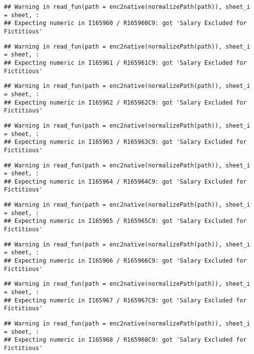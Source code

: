 \documentclass[
]{article}
\begin{document}
\begin{verbatim}
## Warning in read_fun(path = enc2native(normalizePath(path)), sheet_i = sheet, :
## Expecting numeric in I165960 / R165960C9: got 'Salary Excluded for Fictitious'
\end{verbatim}

\begin{verbatim}
## Warning in read_fun(path = enc2native(normalizePath(path)), sheet_i = sheet, :
## Expecting numeric in I165961 / R165961C9: got 'Salary Excluded for Fictitious'
\end{verbatim}

\begin{verbatim}
## Warning in read_fun(path = enc2native(normalizePath(path)), sheet_i = sheet, :
## Expecting numeric in I165962 / R165962C9: got 'Salary Excluded for Fictitious'
\end{verbatim}

\begin{verbatim}
## Warning in read_fun(path = enc2native(normalizePath(path)), sheet_i = sheet, :
## Expecting numeric in I165963 / R165963C9: got 'Salary Excluded for Fictitious'
\end{verbatim}

\begin{verbatim}
## Warning in read_fun(path = enc2native(normalizePath(path)), sheet_i = sheet, :
## Expecting numeric in I165964 / R165964C9: got 'Salary Excluded for Fictitious'
\end{verbatim}

\begin{verbatim}
## Warning in read_fun(path = enc2native(normalizePath(path)), sheet_i = sheet, :
## Expecting numeric in I165965 / R165965C9: got 'Salary Excluded for Fictitious'
\end{verbatim}

\begin{verbatim}
## Warning in read_fun(path = enc2native(normalizePath(path)), sheet_i = sheet, :
## Expecting numeric in I165966 / R165966C9: got 'Salary Excluded for Fictitious'
\end{verbatim}

\begin{verbatim}
## Warning in read_fun(path = enc2native(normalizePath(path)), sheet_i = sheet, :
## Expecting numeric in I165967 / R165967C9: got 'Salary Excluded for Fictitious'
\end{verbatim}

\begin{verbatim}
## Warning in read_fun(path = enc2native(normalizePath(path)), sheet_i = sheet, :
## Expecting numeric in I165968 / R165968C9: got 'Salary Excluded for Fictitious'
\end{verbatim}
\end{document}

